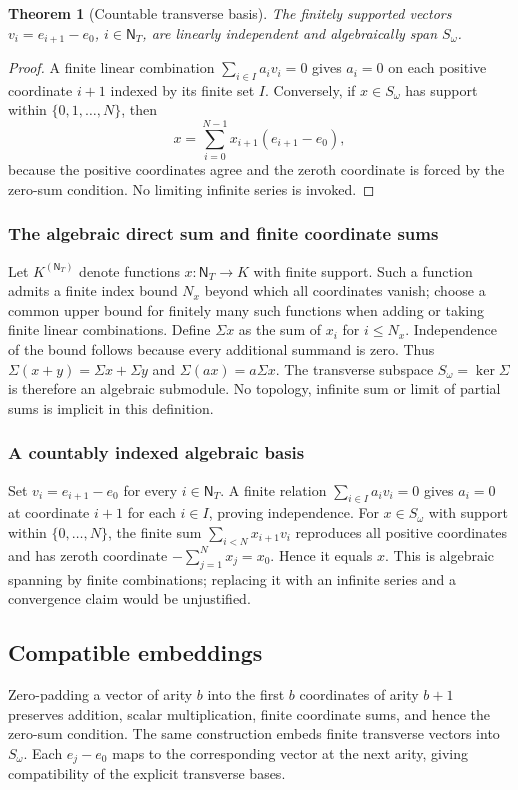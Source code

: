 \documentclass[11pt,reqno]{amsart}
\newtheorem{theorem}{Theorem}[section]
\theoremstyle{definition}\newtheorem{definition}[theorem]{Definition}
\theoremstyle{remark}\newtheorem{remark}[theorem]{Remark}
\newcommand{\N}{\mathsf N_T}\newcommand{\Z}{\mathsf Z_T}\newcommand{\Q}{\mathsf Q_T}\newcommand{\RR}{\mathsf R}
\begin{document}
\begin{theorem}[Countable transverse basis]\label{thm:omegabasis}
The finitely supported vectors $v_i=e_{i+1}-e_0$, $i\in\N$, are linearly independent and algebraically span $S_\omega$.
\end{theorem}
\begin{proof}
A finite linear combination $\sum_{i\in I}a_iv_i=0$ gives $a_i=0$ on each positive coordinate $i+1$ indexed by its finite set $I$. Conversely, if $x\in S_\omega$ has support within $\{0,1,\ldots,N\}$, then
\[x=\sum_{i=0}^{N-1}x_{i+1}(e_{i+1}-e_0),\]
because the positive coordinates agree and the zeroth coordinate is forced by the zero-sum condition. No limiting infinite series is invoked.
\end{proof}


\medskip
\subsubsection*{The algebraic direct sum and finite coordinate sums}\label{supp:9-1}
Let $K^{(\N)}$ denote functions $x:\N\to K$ with finite support. Such a function admits a finite index bound $N_x$ beyond which all coordinates vanish; choose a common upper bound for finitely many such functions when adding or taking finite linear combinations. Define $\Sigma x$ as the sum of $x_i$ for $i\le N_x$. Independence of the bound follows because every additional summand is zero. Thus $\Sigma(x+y)=\Sigma x+\Sigma y$ and $\Sigma(ax)=a\Sigma x$. The transverse subspace $S_\omega=\ker\Sigma$ is therefore an algebraic submodule. No topology, infinite sum or limit of partial sums is implicit in this definition.
\medskip
\medskip
\subsubsection*{A countably indexed algebraic basis}\label{supp:9-2}
Set $v_i=e_{i+1}-e_0$ for every $i\in\N$. A finite relation $\sum_{i\in I}a_iv_i=0$ gives $a_i=0$ at coordinate $i+1$ for each $i\in I$, proving independence. For $x\in S_\omega$ with support within $\{0,\ldots,N\}$, the finite sum $\sum_{i<N}x_{i+1}v_i$ reproduces all positive coordinates and has zeroth coordinate $-\sum_{j=1}^{N}x_j=x_0$. Hence it equals $x$. This is algebraic spanning by finite combinations; replacing it with an infinite series and a convergence claim would be unjustified.
\medskip

\subsection{Compatible embeddings}\label{main:sub-29}
Zero-padding a vector of arity $b$ into the first $b$ coordinates of arity $b+1$ preserves addition, scalar multiplication, finite coordinate sums, and hence the zero-sum condition. The same construction embeds finite transverse vectors into $S_\omega$. Each $e_j-e_0$ maps to the corresponding vector at the next arity, giving compatibility of the explicit transverse bases.
\end{document}
